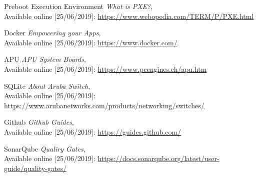 \begin{thebibliography}{9}
    Preboot Execution Environment
    \textit{What is PXE?}, \\
    Available online [25/06/2019]:
    \url{https://www.webopedia.com/TERM/P/PXE.html} \\
    \vspace{-0.5cm}
        
    Docker
    \textit{Empowering your Apps}, \\
    Available online [25/06/2019]:
    \url{https://www.docker.com/} \\
    \vspace{-0.5cm}
        
    APU
    \textit{APU System Boards}, \\
    Available online [25/06/2019]:
    \url{https://www.pcengines.ch/apu.htm} \\
    \vspace{-0.5cm}
        
    SQLite
    \textit{About Aruba Switch}, \\
    Available online [25/06/2019]:
    \url{https://www.arubanetworks.com/products/networking/switches/} \\
    \vspace{-0.5cm}
        
    Github
    \textit{Github Guides}, \\
    Available online [25/06/2019]:
    \url{https://guides.github.com/} \\
    \vspace{-0.5cm}

    SonarQube
    \textit{Qualiry Gates}, \\
    Available online [25/06/2019]:  
    \url{https://docs.sonarqube.org/latest/user-guide/quality-gates/} \\
    \vspace{-0.5cm}
\end{thebibliography}
\newpage
\hfill\break
